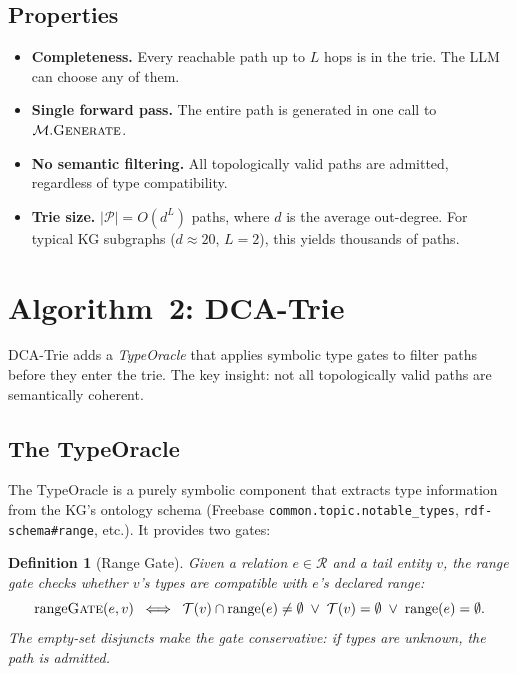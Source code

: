 \documentclass[11pt,a4paper]{article}
\newcommand{\T}{\mathcal{T}}
\newcommand{\R}{\mathcal{R}}
\newcommand{\range}{\mathrm{range}}
\newtheorem{definition}{Definition}
\begin{document}
\subsection{Properties}

\begin{itemize}
  \item \textbf{Completeness.}  Every reachable path up to $L$ hops is
    in the trie.  The LLM can choose any of them.
  \item \textbf{Single forward pass.}  The entire path is generated in
    one call to $\mathcal{M}.\textsc{Generate}$.
  \item \textbf{No semantic filtering.}  All topologically valid paths
    are admitted, regardless of type compatibility.
  \item \textbf{Trie size.}  $|\mathcal{P}| = O(d^L)$ paths, where $d$
    is the average out-degree.  For typical KG subgraphs ($d \approx
    20$, $L = 2$), this yields thousands of paths.
\end{itemize}

\section{Algorithm~2: DCA-Trie}

DCA-Trie adds a \emph{TypeOracle} that applies symbolic type gates to
filter paths before they enter the trie.  The key insight: not all
topologically valid paths are semantically coherent.

\subsection{The TypeOracle}

The TypeOracle is a purely symbolic component that extracts type
information from the KG's ontology schema (Freebase
\texttt{common.topic.notable\_types}, \texttt{rdf-schema\#range},
etc.).  It provides two gates:

\begin{definition}[Range Gate]
Given a relation $e \in \R$ and a tail entity $v$, the range gate
checks whether $v$'s types are compatible with $e$'s declared range:
\[
  \range\textsc{Gate}(e, v) \;\iff\;
  \T(v) \cap \range(e) \neq \emptyset
  \;\lor\; \T(v) = \emptyset
  \;\lor\; \range(e) = \emptyset.
\]
The empty-set disjuncts make the gate \emph{conservative}: if types
are unknown, the path is admitted.
\end{definition}
\end{document}
